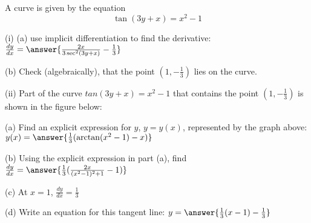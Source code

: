 \documentclass{ximera}
\begin{document}
\begin{exercise}
A curve is given by the equation $$\tan(3y+x)=x^2-1$$

(i) (a) use implicit differentiation to find the derivative: $\frac{dy}{dx}=\answer{\frac{2x}{3\sec^2(3y+x)}-\frac{1}{3}}$

(b) Check (algebraically), that the point $(1,-\frac{1}{3})$ lies on the curve.

(ii) Part of the curve $tan(3y+x)=x^2-1$ that contains the point $(1,-\frac{1}{3})$ is shown in the figure below:

\begin{image}
\end{image}

(a) Find an explicit expression for $y$, $y=y(x)$, represented by the graph above: $y(x)=\answer{\frac{1}{3}(\arctan(x^2-1)-x)}$

(b) Using the explicit expression in part (a), find $\frac{dy}{dx}=\answer{\frac{1}{3}(\frac{2x}{(x^2-1)^2+1}-1)}$

(c) At $x=1$, $\frac{dy}{dx}=\frac{1}{3}$



(d) Write an equation for this tangent line: $y=\answer{\frac{1}{3}(x-1)-\frac{1}{3}}$
\end{exercise}
\end{document}
